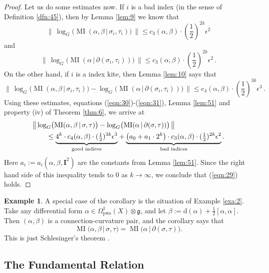 \documentclass[10pt, a4paper]{amsart}
\theoremstyle{definition}
\newtheorem{exa}[equation]{Example}
\numberwithin{equation}{section}
\newcommand{\opn}{\operatorname}
\newcommand{\mfrak}[1]{\mathfrak{#1}}
\newcommand{\mbf}[1]{\mathbf{#1}}
\newcommand{\mrm}[1]{\mathrm{#1}}
\newcommand{\smfrac}[2]{{\textstyle \frac{#1}{#2}}}
\newcommand{\tup}[1]{\textup{#1}}
\newcommand{\Norm}[1]{\bigl\lVert\, #1 \, \bigr\rVert}
\renewcommand{\vert}{\, | \,}
\newcommand{\g}{\mfrak{g}}
\renewcommand{\d}{\mrm{d}}
\begin{document}
\begin{proof}
Let us do some estimates now. If $i$ is a bad index (in the sense of 
Definition \ref{dfn:45}), then by Lemma \ref{lem:9} we know that
\[ \Norm{ \log_G \bigl( \opn{MI} (\alpha, \beta \vert \sigma_i, \tau_i) \bigr) 
} \leq c_3(\alpha, \beta) \cdot (\smfrac{1}{2})^{2 k} \epsilon^{2} \]
and
\[ \Norm{ \log_G \bigl( \opn{MI} (\alpha \vert \partial(\sigma_i, \tau_i))
\bigr) } \leq c_3(\alpha, \beta) \cdot (\smfrac{1}{2})^{2 k} \epsilon^{2} \, .
\]
On the other hand, if $i$ is a index kite, then Lemma
\ref{lem:10} says that 
\[ \Norm{ \log_G \bigl( \opn{MI} (\alpha, \beta \vert \sigma_i, \tau_i) \bigr) -
\log_G \bigl( \opn{MI} (\alpha \vert \partial(\sigma_i, \tau_i)) \bigr) }
\leq c_4(\alpha, \beta) \cdot  (\smfrac{1}{2})^{3 k} \epsilon^{3} \, . \]
Using these estimates, equations (\ref{eqn:30})-(\ref{eqn:31}),
Lemma \ref{lem:51} and property (iv) of Theorem \ref{thm:6}, we arrive at
\[ \begin{aligned}
& \Norm{ \log_G \bigl( \opn{MI} (\alpha, \beta \vert \sigma, \tau) \bigr)
- \log_G \bigl( \opn{MI} (\alpha \vert \partial(\sigma, \tau))
\bigr) } \\
& \qquad \leq 
\underset{\tup{good indices}}{\underbrace{4^k \cdot c_4(\alpha, \beta) \cdot 
(\smfrac{1}{2})^{3 k} \epsilon^{3}}} +
\underset{\tup{bad indices}}{\underbrace{
\bigl( a_0 + a_1 \cdot 2^k \bigr) \cdot 
c_3(\alpha, \beta) \cdot (\smfrac{1}{2})^{2 k} \epsilon^{2}}} \, .
\end{aligned} \]
Here 
$a_i := a_i(\alpha, \beta, \mbf{I}^2)$ are the constants from Lemma 
\ref{lem:51}. 
Since the right hand side of this inequality tends to $0$ as $k \to \infty$, 
we conclude that (\ref{eqn:29}) holds.
\end{proof}

\begin{exa} \label{exa:3}
A special case of the corollary is the situation of Example \ref{exa:2}. Take
any differential form 
$\alpha \in \Omega^1_{\mrm{pws}}(X) \otimes \g$, 
and let 
$\beta := \d (\alpha) + \smfrac{1}{2} [\alpha, \alpha]$. 
Then $(\alpha, \beta)$ is a connection-curvature pair, 
and the corollary says that
\[ \opn{MI} (\alpha, \beta \vert \sigma, \tau) =
\opn{MI} \bigl( \alpha \vert \partial (\sigma, \tau) \bigr) . \]
This is just Schlesinger's theorem \cite{DF}. 
\end{exa}


\subsection{The Fundamental Relation}
\end{document}
